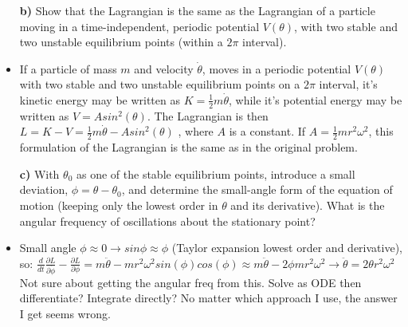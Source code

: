 \documentclass[11pt,a4paper]{report}
\newcounter{excount}[chapter]
\newenvironment{exercise}[1][]{\addtocounter{excount}{1} \noindent {\bf Problem
    \arabic{excount} \ \ #1}\hspace{2mm}}{\vspace{4mm}}
\begin{document}
\begin{exercise}
\begin{itemize}
\item[\bf b)] Show that the Lagrangian is the same as the Lagrangian of a particle moving in a time-independent, periodic potential $V(\theta)$, with two stable and two unstable equilibrium points (within a $2\pi$ interval).

\item If a particle of mass $m$ and velocity $\dot{\theta}$, moves in a periodic potential $V(\theta)$ with two stable and two unstable equilibrium points on a $2\pi$ interval, it's kinetic energy may be written as $K=\frac{1}{2}m\dot{\theta}$, while it's potential energy may be written as $V=Asin^2(\theta)$. The Lagrangian is then $L=K-V=\frac{1}{2}m\dot{\theta}-Asin^2(\theta)$  , where $A$ is a constant. If $A=\frac{1}{2} m r^2\omega^2 $, this formulation of the Lagrangian is the same as in the original problem.

\item[\bf c)] With $\theta_0$ as one of the stable equilibrium points, introduce a small deviation, $\phi=\theta-\theta_0$, and determine the small-angle form of the equation of motion (keeping only the lowest order in $\theta$ and its derivative). What is the angular frequency of oscillations about the stationary point?

\item Small angle $\phi \approx 0 \rightarrow sin \phi \approx \phi$ (Taylor expansion lowest order and derivative), so: $\frac{d}{dt}\frac{\partial L}{\partial \dot{\phi}}-\frac{\partial L}{\partial \phi}=
m\ddot{\theta}-m r^2\omega^2 sin(\phi)cos(\phi)\approx m\ddot{\theta}- 2\phi m r^2\omega^2 \rightarrow  \ddot{\theta}= 2\theta  r^2\omega^2$ Not sure about getting the angular freq from this. Solve as ODE then differentiate? Integrate directly? No matter which approach I use, the answer I get seems wrong.

\end{itemize}
\end{exercise}
\end{document}
